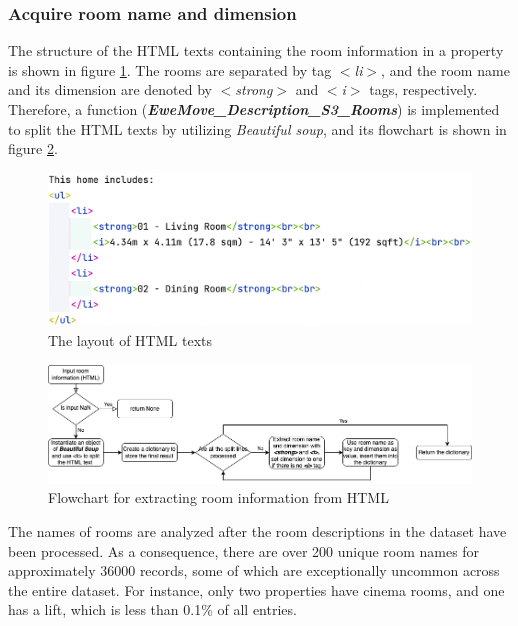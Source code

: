 \documentclass[12pt,twoside]{report}
\begin{document}
\subsubsection{Acquire room name and dimension}
The structure of the HTML texts containing the room information in a property is shown in figure \ref{html_structure}. The rooms are separated by tag \textit{$<$li$>$}, and the room name and its dimension are denoted by \textit{$<$strong$>$} and \textit{$<$i$>$} tags, respectively. Therefore, a function (\textit{\textbf{EweMove\_Description\_S3\_Rooms}}) is implemented to split the HTML texts by utilizing \textit{Beautiful soup}, and its flowchart is shown in figure \ref{html_room_info}.
\begin{figure}[H]
	\centering
	\includegraphics[width=15cm]{html_structure}
	\caption{The layout of HTML texts}
	\label{html_structure}
\end{figure}

\begin{figure}[!htbp]
	\centering
	\includegraphics[width=1\linewidth]{html_room_info}
	\caption{Flowchart for extracting room information from HTML}
	\label{html_room_info}
\end{figure}

The names of rooms are analyzed after the room descriptions in the dataset have been processed. As a consequence, there are over 200 unique room names for approximately 36000 records, some of which are exceptionally uncommon across the entire dataset. For instance, only two properties have cinema rooms, and one has a lift, which is less than 0.1\% of all entries.  
\\
\end{document}
